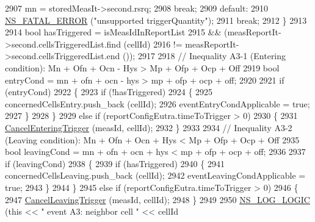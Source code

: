 \begin{DoxyCode}
2907                 mn = storedMeasIt->second.rsrq;
2908                 \textcolor{keywordflow}{break};
2909               \textcolor{keywordflow}{default}:
2910                 \hyperlink{group__fatal_ga5131d5e3f75d7d4cbfd706ac456fdc85}{NS\_FATAL\_ERROR} (\textcolor{stringliteral}{"unsupported triggerQuantity"});
2911                 \textcolor{keywordflow}{break};
2912               \}
2913 
2914             \textcolor{keywordtype}{bool} hasTriggered = isMeasIdInReportList
2915               && (measReportIt->second.cellsTriggeredList.find (cellId)
2916                   != measReportIt->second.cellsTriggeredList.end ());
2917 
2918             \textcolor{comment}{// Inequality A3-1 (Entering condition): Mn + Ofn + Ocn - Hys > Mp + Ofp + Ocp + Off}
2919             \textcolor{keywordtype}{bool} entryCond = mn + ofn + ocn - hys > mp + ofp + ocp + off;
2920 
2921             \textcolor{keywordflow}{if} (entryCond)
2922               \{
2923                 \textcolor{keywordflow}{if} (!hasTriggered)
2924                   \{
2925                     concernedCellsEntry.push\_back (cellId);
2926                     eventEntryCondApplicable = \textcolor{keyword}{true};
2927                   \}
2928               \}
2929             \textcolor{keywordflow}{else} \textcolor{keywordflow}{if} (reportConfigEutra.timeToTrigger > 0)
2930               \{
2931                 \hyperlink{classns3_1_1LteUeRrc_a9221d85411de5dd375b71b44e3331c5c}{CancelEnteringTrigger} (measId, cellId);
2932               \}
2933 
2934             \textcolor{comment}{// Inequality A3-2 (Leaving condition): Mn + Ofn + Ocn + Hys < Mp + Ofp + Ocp + Off}
2935             \textcolor{keywordtype}{bool} leavingCond = mn + ofn + ocn + hys < mp + ofp + ocp + off;
2936 
2937             \textcolor{keywordflow}{if} (leavingCond)
2938               \{
2939                 \textcolor{keywordflow}{if} (hasTriggered)
2940                   \{
2941                     concernedCellsLeaving.push\_back (cellId);
2942                     eventLeavingCondApplicable = \textcolor{keyword}{true};
2943                   \}
2944               \}
2945             \textcolor{keywordflow}{else} \textcolor{keywordflow}{if} (reportConfigEutra.timeToTrigger > 0)
2946               \{
2947                 \hyperlink{classns3_1_1LteUeRrc_a3e35c475cfb5361222f1556bfbd3111d}{CancelLeavingTrigger} (measId, cellId);
2948               \}
2949 
2950             \hyperlink{group__logging_ga88acd260151caf2db9c0fc84997f45ce}{NS\_LOG\_LOGIC} (\textcolor{keyword}{this} << \textcolor{stringliteral}{" event A3: neighbor cell "} << cellId

\end{DoxyCode}
